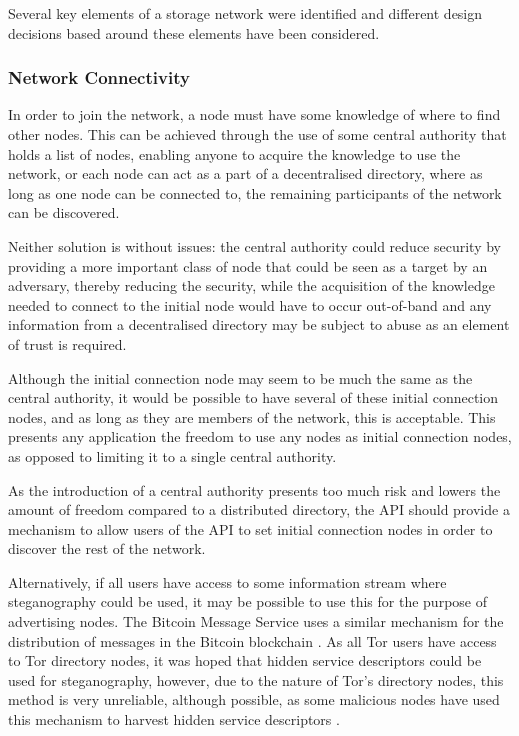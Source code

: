 Several key elements of a storage network were identified and different design decisions based around these elements have been considered. 
		
		\subsubsection{Network Connectivity}
			In order to join the network, a node must have some knowledge of where to find other nodes. This can be achieved through the use of some central authority that holds a list of nodes, enabling anyone to acquire the knowledge to use the network, or each node can act as a part of a decentralised directory, where as long as one node can be connected to, the remaining participants of the network can be discovered.
			
			Neither solution is without issues: the central authority could reduce security by providing a more important class of node that could be seen as a target by an adversary, thereby reducing the security, while the acquisition of the knowledge needed to connect to the initial node would have to occur out-of-band and any information from a decentralised directory may be subject to abuse as an element of trust is required.
			
			Although the initial connection node may seem to be much the same as the central authority, it would be possible to have several of these initial connection nodes, and as long as they are members of the network, this is acceptable. This presents any application the freedom to use any nodes as initial connection nodes, as opposed to limiting it to a single central authority.
			
			As the introduction of a central authority presents too much risk and lowers the amount of freedom compared to a distributed directory, the API should provide a mechanism to allow users of the API to set initial connection nodes in order to discover the rest of the network.
			
			Alternatively, if all users have access to some information stream where steganography could be used, it may be possible to use this for the purpose of advertising nodes. The Bitcoin Message Service uses a similar mechanism for the distribution of messages in the Bitcoin blockchain \cite{btcmsg}. As all Tor users have access to Tor directory nodes, it was hoped that hidden service descriptors could be used for steganography, however, due to the nature of Tor's directory nodes, this method is very unreliable, although possible, as some malicious nodes have used this mechanism to harvest hidden service descriptors \cite{crawl}.
			
